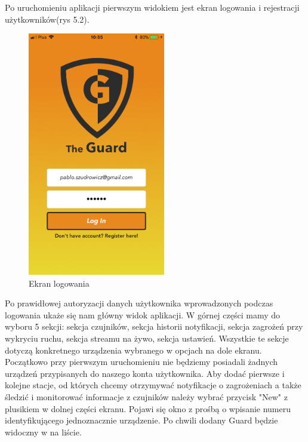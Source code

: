 Po uruchomieniu aplikacji pierwszym widokiem jest ekran logowania i rejestracji użytkowników(rys 5.2).
\begin{figure}[h]
	\centering
	\includegraphics[width=6cm]{login.png}
	\caption{Ekran logowania}
\end{figure}

Po prawidłowej autoryzacji danych użytkownika wprowadzonych podczas logowania ukaże się nam główny widok aplikacji. W górnej części mamy do wyboru 5 sekcji:
sekcja czujników, sekcja historii notyfikacji, sekcja zagrożeń przy wykryciu ruchu, sekcja streamu na żywo, sekcja ustawień. Wszystkie te sekcje dotyczą konkretnego urządzenia wybranego w opcjach na dole ekranu. Początkowo przy pierwszym uruchomieniu nie będziemy posiadali żadnych urządzeń przypisanych do naszego konta użytkownika. Aby dodać pierwsze i kolejne stacje, od których chcemy otrzymywać notyfikacje o zagrożeniach a także śledzić i monitorować informacje z czujników należy wybrać przycisk "New" z plusikiem w dolnej części ekranu. Pojawi się okno z prośbą o wpisanie numeru identyfikującego jednoznacznie urządzenie. Po chwili dodany Guard będzie widoczny w na liście.

